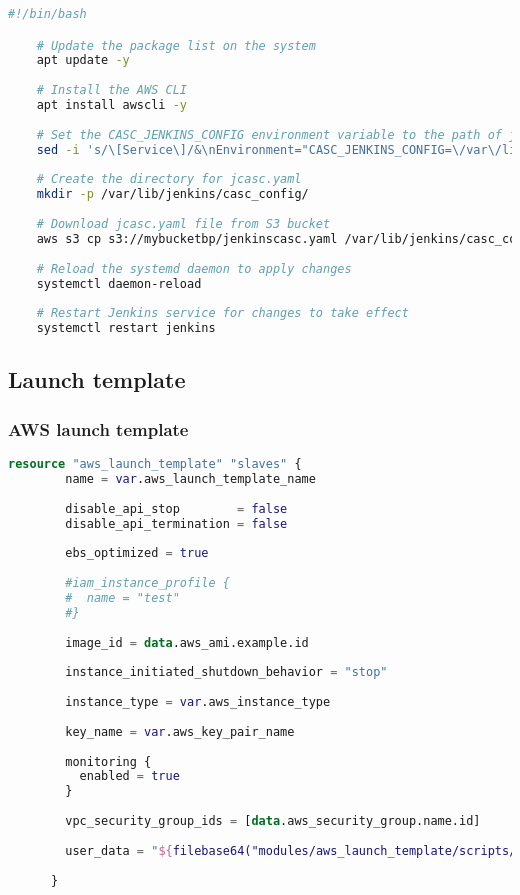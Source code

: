 \begin{lstlisting}[language=bash, style=bashstyle]
    #!/bin/bash

    # Update the package list on the system
    apt update -y
    
    # Install the AWS CLI
    apt install awscli -y
    
    # Set the CASC_JENKINS_CONFIG environment variable to the path of jcasc.yaml
    sed -i 's/\[Service\]/&\nEnvironment="CASC_JENKINS_CONFIG=\/var\/lib\/jenkins\/casc_config"/' /lib/systemd/system/jenkins.service
    
    # Create the directory for jcasc.yaml
    mkdir -p /var/lib/jenkins/casc_config/
    
    # Download jcasc.yaml file from S3 bucket
    aws s3 cp s3://mybucketbp/jenkinscasc.yaml /var/lib/jenkins/casc_config
    
    # Reload the systemd daemon to apply changes
    systemctl daemon-reload
    
    # Restart Jenkins service for changes to take effect
    systemctl restart jenkins
\end{lstlisting}

\subsection{
{Launch template}}
\label{sec:Launch template}

\subsubsection{
{AWS launch template}}

\begin{lstlisting}[language=terraform]
    resource "aws_launch_template" "slaves" {
        name = var.aws_launch_template_name
      
        disable_api_stop        = false
        disable_api_termination = false
      
        ebs_optimized = true
      
        #iam_instance_profile {
        #  name = "test"
        #}
      
        image_id = data.aws_ami.example.id
      
        instance_initiated_shutdown_behavior = "stop"
      
        instance_type = var.aws_instance_type
      
        key_name = var.aws_key_pair_name
      
        monitoring {
          enabled = true
        }
      
        vpc_security_group_ids = [data.aws_security_group.name.id]
      
        user_data = "${filebase64("modules/aws_launch_template/scripts/${var.script}")}"
      
      }
\end{lstlisting}


